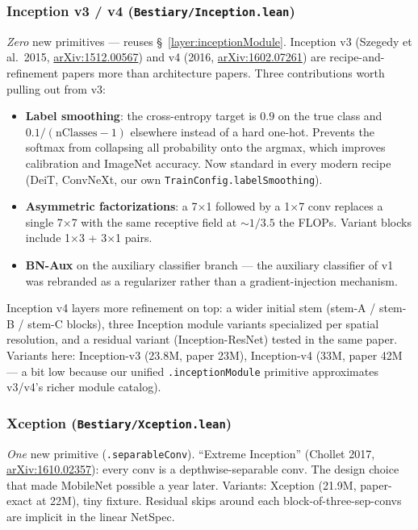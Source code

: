 \subsubsection*{Inception v3 / v4 (\texttt{Bestiary/Inception.lean})}
\emph{Zero} new primitives --- reuses
\S~\ref{layer:inceptionModule}. Inception v3 (Szegedy et al.\ 2015,
\href{https://arxiv.org/abs/1512.00567}{arXiv:1512.00567}) and v4
(2016, \href{https://arxiv.org/abs/1602.07261}{arXiv:1602.07261})
are recipe-and-refinement papers more than architecture papers.
Three contributions worth pulling out from v3:

\begin{itemize}
  \item \textbf{Label smoothing}: the cross-entropy target is
    $0.9$ on the true class and $0.1 / (\mathrm{nClasses} - 1)$
    elsewhere instead of a hard one-hot. Prevents the softmax from
    collapsing all probability onto the argmax, which improves
    calibration and ImageNet accuracy. Now standard in every
    modern recipe (DeiT, ConvNeXt, our own
    \texttt{TrainConfig.labelSmoothing}).
  \item \textbf{Asymmetric factorizations}: a 7$\times$1 followed
    by a 1$\times$7 conv replaces a single 7$\times$7 with the
    same receptive field at $\sim$$1/3.5$ the FLOPs. Variant
    blocks include 1$\times$3 + 3$\times$1 pairs.
  \item \textbf{BN-Aux} on the auxiliary classifier branch ---
    the auxiliary classifier of v1 was rebranded as a regularizer
    rather than a gradient-injection mechanism.
\end{itemize}

Inception v4 layers more refinement on top: a wider initial stem
(stem-A / stem-B / stem-C blocks), three Inception module variants
specialized per spatial resolution, and a residual variant
(Inception-ResNet) tested in the same paper. Variants here:
Inception-v3 (23.8M, paper 23M), Inception-v4 (33M, paper 42M ---
a bit low because our unified \texttt{.inceptionModule} primitive
approximates v3/v4's richer module catalog).

\subsubsection*{Xception (\texttt{Bestiary/Xception.lean})}
\emph{One} new primitive (\texttt{.separableConv}).
``Extreme Inception'' (Chollet 2017,
\href{https://arxiv.org/abs/1610.02357}{arXiv:1610.02357}): every conv
is a depthwise-separable conv. The
design choice that made MobileNet possible a year later. Variants:
Xception (21.9M, paper-exact at 22M), tiny fixture. Residual skips
around each block-of-three-sep-convs are implicit in the linear
NetSpec.

